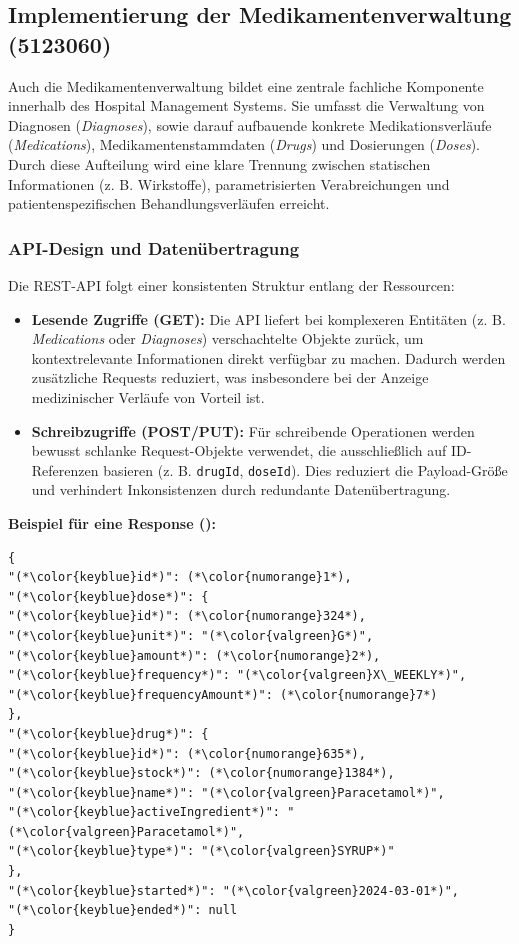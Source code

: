 \subsection{Implementierung der Medikamentenverwaltung (5123060)}
Auch die Medikamentenverwaltung bildet eine zentrale fachliche Komponente innerhalb des Hospital Management Systems.
Sie umfasst die Verwaltung von Diagnosen (\textit{Diagnoses}), sowie darauf aufbauende konkrete Medikationsverläufe (\textit{Medications}), Medikamentenstammdaten (\textit{Drugs}) und Dosierungen (\textit{Doses}).
Durch diese Aufteilung wird eine klare Trennung zwischen statischen Informationen (z. B. Wirkstoffe), parametrisierten Verabreichungen und patientenspezifischen Behandlungsverläufen erreicht.

\subsubsection{API-Design und Datenübertragung}
Die REST-API folgt einer konsistenten Struktur entlang der Ressourcen:

\begin{itemize}
\item \textbf{Lesende Zugriffe (GET):}
Die API liefert bei komplexeren Entitäten (z. B. \textit{Medications} oder \textit{Diagnoses}) verschachtelte Objekte zurück, um kontextrelevante Informationen direkt verfügbar zu machen.
Dadurch werden zusätzliche Requests reduziert, was insbesondere bei der Anzeige medizinischer Verläufe von Vorteil ist.

\item \textbf{Schreibzugriffe (POST/PUT):}
Für schreibende Operationen werden bewusst schlanke Request-Objekte verwendet, die ausschließlich auf ID-Referenzen basieren (z. B. \texttt{drugId}, \texttt{doseId}). 
Dies reduziert die Payload-Größe und verhindert Inkonsistenzen durch redundante Datenübertragung.

\end{itemize}

\textbf{Beispiel für eine Response (\texttt{}):}

\begin{lstlisting}
{
"(*\color{keyblue}id*)": (*\color{numorange}1*),
"(*\color{keyblue}dose*)": {
"(*\color{keyblue}id*)": (*\color{numorange}324*),
"(*\color{keyblue}unit*)": "(*\color{valgreen}G*)",
"(*\color{keyblue}amount*)": (*\color{numorange}2*),
"(*\color{keyblue}frequency*)": "(*\color{valgreen}X\_WEEKLY*)",
"(*\color{keyblue}frequencyAmount*)": (*\color{numorange}7*)
},
"(*\color{keyblue}drug*)": {
"(*\color{keyblue}id*)": (*\color{numorange}635*),
"(*\color{keyblue}stock*)": (*\color{numorange}1384*),
"(*\color{keyblue}name*)": "(*\color{valgreen}Paracetamol*)",
"(*\color{keyblue}activeIngredient*)": "(*\color{valgreen}Paracetamol*)",
"(*\color{keyblue}type*)": "(*\color{valgreen}SYRUP*)"
},
"(*\color{keyblue}started*)": "(*\color{valgreen}2024-03-01*)",
"(*\color{keyblue}ended*)": null
}
\end{lstlisting}

